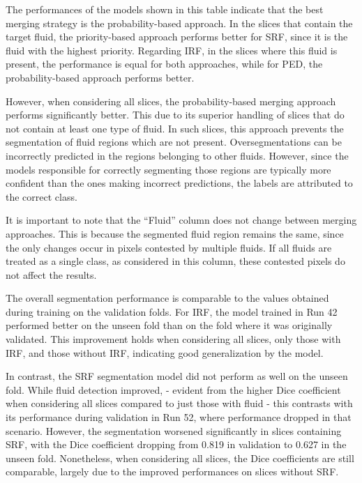 The performances of the models shown in this table indicate that the best merging strategy is the probability-based approach. In the slices that contain the target fluid, the priority-based approach performs better for SRF, since it is the fluid with the highest priority. Regarding IRF, in the slices where this fluid is present, the performance is equal for both approaches, while for PED, the probability-based approach performs better.
\par
However, when considering all slices, the probability-based merging approach performs significantly better. This due to its superior handling of slices that do not contain at least one type of fluid. In such slices, this approach prevents the segmentation of fluid regions which are not present. Oversegmentations can be incorrectly predicted in the regions belonging to other fluids. However, since the models responsible for correctly segmenting those regions are typically more confident than the ones making incorrect predictions, the labels are attributed to the correct class.
\par
It is important to note that the ``Fluid'' column does not change between merging approaches. This is because the segmented fluid region remains the same, since the only changes occur in pixels contested by multiple fluids. If all fluids are treated as a single class, as considered in this column, these contested pixels do not affect the results.
\par
The overall segmentation performance is comparable to the values obtained during training on the validation folds. For IRF, the model trained in Run 42 performed better on the unseen fold than on the fold where it was originally validated. This improvement holds when considering all slices, only those with IRF, and those without IRF, indicating good generalization by the model.
\par
In contrast, the SRF segmentation model did not perform as well on the unseen fold. While fluid detection improved, - evident from the higher Dice coefficient when considering all slices compared to just those with fluid - this contrasts with its performance during validation in Run 52, where performance dropped in that scenario. However, the segmentation worsened significantly in slices containing SRF, with the Dice coefficient dropping from 0.819 in  validation to 0.627 in the unseen fold. Nonetheless, when considering all slices, the Dice coefficients are still comparable, largely due to the improved performances on slices without SRF.
\par
